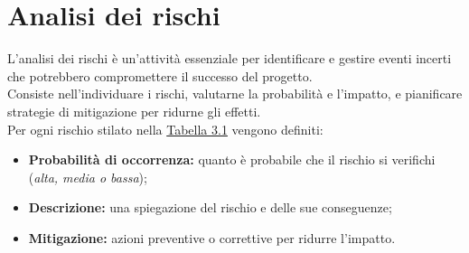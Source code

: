 \pagebreak
\section{Analisi dei rischi}
\label{sez:analisi-dei-rischi}

L'analisi dei rischi è un'attività essenziale per identificare e gestire eventi incerti che potrebbero compromettere il successo del progetto. \\
Consiste nell’individuare i rischi, valutarne la probabilità e l’impatto, e pianificare strategie di mitigazione per ridurne gli effetti.\\

\noindent Per ogni rischio stilato nella {\hyperref[tab:analisi-rischi]{Tabella 3.1}} vengono definiti:

\begin{itemize}
    \item \textbf{Probabilità di occorrenza:} quanto è probabile che il rischio si verifichi (\textit{alta, media o bassa});
    \item \textbf{Descrizione:} una spiegazione del rischio e delle sue conseguenze;
    \item \textbf{Mitigazione:} azioni preventive o correttive per ridurre l’impatto.
\end{itemize}

\renewcommand{\arraystretch}{1.5} %

